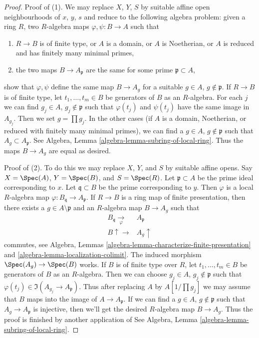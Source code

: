 \begin{proof}
Proof of (1). We may replace $X$, $Y$, $S$ by suitable affine open
neighbourhoods of $x$, $y$, $s$ and reduce to the following algebra
problem: given a ring $R$, two $R$-algebra maps $\varphi, \psi : B \to A$
such that
\begin{enumerate}
\item $R \to B$ is of finite type, or $A$ is a domain, or $A$
is Noetherian, or $A$ is reduced and has finitely many minimal primes,
\item the two maps $B \to A_\mathfrak p$ are the same for
some prime $\mathfrak p \subset A$,
\end{enumerate}
show that $\varphi, \psi$ define the same map $B \to A_g$ for
a suitable $g \in A$, $g \not \in \mathfrak p$. If $R \to B$ is of
finite type, let $t_1, \ldots, t_m \in B$ be generators of $B$
as an $R$-algebra. For each $j$ we can find
$g_j \in A$, $g_j \not \in \mathfrak p$
such that $\varphi(t_j)$ and $\psi(t_j)$ have the same image in
$A_{g_j}$. Then we set $g = \prod g_j$.
In the other cases (if $A$ is a domain, Noetherian, or reduced
with finitely many minimal primes), we can find a $g \in A$,
$g \not \in \mathfrak p$ such that $A_g \subset A_\mathfrak p$.
See Algebra, Lemma \ref{algebra-lemma-subring-of-local-ring}.
Thus the maps $B \to A_g$ are equal as desired.

\medskip\noindent
Proof of (2). To do this we may replace $X$, $Y$, and $S$ by suitable affine
opens. Say $X = \Spec(A)$, $Y = \Spec(B)$, and $S = \Spec(R)$.
Let $\mathfrak p \subset A$ be the prime ideal corresponding to $x$.
Let $\mathfrak q \subset B$ be the prime corresponding to $y$.
Then $\varphi$ is a local $R$-algebra map
$\varphi : B_\mathfrak q \to A_\mathfrak p$.
If $R \to B$ is a ring map of finite presentation, then there exists a
$g \in A \setminus \mathfrak p$ and an $R$-algebra map $B \to A_g$ such that
$$
\begin{array}{cc}B_\mathfrak q \underset{\varphi}{\longrightarrow} & A_\mathfrak p \\ B \uparrow\longrightarrow & A_g \uparrow\end{array}
$$
commutes, see
Algebra, Lemmas \ref{algebra-lemma-characterize-finite-presentation} and
\ref{algebra-lemma-localization-colimit}.
The induced morphism $\Spec(A_g) \to \Spec(B)$ works.
If $B$ is of finite type over $R$, let $t_1, \ldots, t_m \in B$ be
generators of $B$ as an $R$-algebra. Then we can choose
$g_j \in A$, $g_j \not \in \mathfrak p$
such that $\varphi(t_j) \in \Im(A_{g_j} \to A_\mathfrak p)$.
Thus after replacing $A$ by $A[1/\prod g_j]$ we may assume
that $B$ maps into the image of $A \to A_\mathfrak p$.
If we can find a $g \in A$, $g \not \in \mathfrak p$
such that $A_g \to A_\mathfrak p$ is injective, then
we'll get the desired $R$-algebra map $B \to A_g$.
Thus the proof is finished by another application of
See Algebra, Lemma \ref{algebra-lemma-subring-of-local-ring}.
\end{proof}

